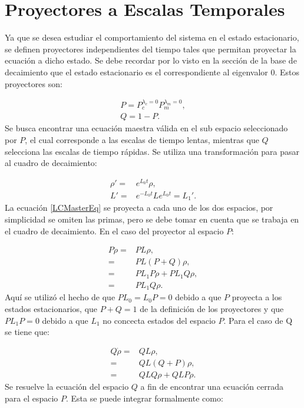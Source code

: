 \documentclass[a4paper,10pt]{report}
\begin{document}
\section{Proyectores a Escalas Temporales}

Ya que se desea estudiar el comportamiento del sistema en el estado estacionario, se definen proyectores independientes del tiempo tales que permitan proyectar la ecuación a dicho estado. Se debe recordar por lo visto en la sección de la base de decaimiento que el estado estacionario es el correspondiente al eigenvalor 0. Estos proyectores son:

\begin{align}
P = P_c^{\lambda_c = 0}P_m^{\lambda_m = 0},\\
Q = 1 - P.
\end{align} Se busca encontrar una ecuación maestra válida en el sub espacio seleccionado por $P$, el cual corresponde a las escalas de tiempo lentas, mientras que $Q$ selecciona las escalas de tiempo rápidas. Se utiliza una transformación para pasar al cuadro de decaimiento:

\begin{align*}
 \rho' =& e^{L_0t}\rho,\\
 L' =& e^{-L_0t}Le^{L_0t} = L_1'.
\end{align*} La ecuación \ref{LCMasterEq} se proyecta a cada uno de los dos espacios, por simplicidad se omiten las primas, pero se debe tomar en cuenta que se trabaja en el cuadro de decaimiento. En el caso del proyector al espacio $P$:

\begin{align*}
P\dot{\rho} =& PL\rho,\\
=& PL(P+Q)\rho,\\
=& PL_1P\rho + PL_1Q\rho,\\
=& PL_1Q\rho.
\end{align*} Aquí se utilizó el hecho de que $PL_0 = L_0P = 0$ debido a que $P$ proyecta a los estados estacionarios,  que $P+Q=1$ de la definición de los proyectores y que $PL_1P=0$ debido a que $L_1$ no concecta estados del espacio $P$. Para el caso de Q se tiene que:

\begin{align*}
Q\dot{\rho} =& QL\rho,\\
=& QL(Q+P)\rho,\\
=& QLQ\rho + QLP\rho.
\end{align*} Se resuelve la ecuación del espacio $Q$ a fin de encontrar una ecuación cerrada para el espacio $P$. Esta se puede integrar formalmente como:
\end{document}
